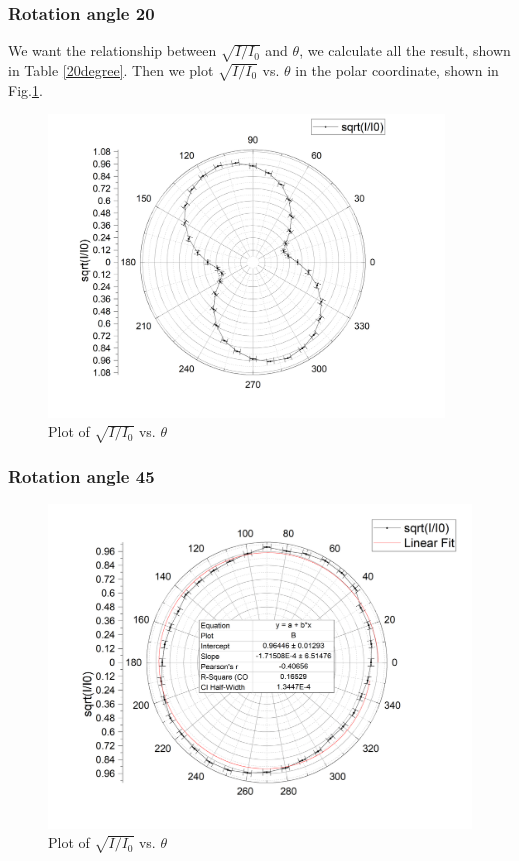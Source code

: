 \documentclass[12pt,a4paper]{article}
\begin{document}
\subsubsection{Rotation angle 20\degree}
We want the relationship between $\sqrt{I/I_0}$ and $\theta$, we calculate all the result, shown in Table \ref{20degree}. Then we plot $\sqrt{I/I_0}$ vs. $\theta$ in the polar coordinate, shown in Fig.\ref{20degreefig}.
\begin{figure}[H]
    \centering
    \includegraphics[width=10.5cm]{20degree.png}
    \caption{Plot of $\sqrt{I/I_0}$ vs. $\theta$}
    \label{20degreefig}
\end{figure}

\subsubsection{Rotation angle 45\degree}
\begin{figure}[H]
    \centering
        \includegraphics[width=12cm]{45degree.jpg}
        \caption{Plot of $\sqrt{I/I_0}$ vs. $\theta$}
        \label{45degreelinearfig}
\end{figure}
\end{document}
